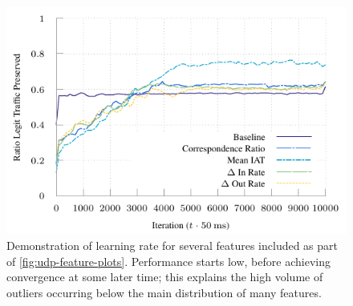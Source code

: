 \documentclass[conference, a4paper, 10pt, times]{IEEEtran}
\begin{document}
\begin{figure}
	\centering
	\includegraphics[width=0.9\linewidth]{../plots/ftprep-good-2}
	\caption{
		Demonstration of learning rate for several features included as part of \cref{fig:udp-feature-plots}.
		Performance starts low, before achieving convergence at some later time; this explains the high volume of outliers occurring below the main distribution of many features.
		\label{fig:udp-fp-converge}
	}
\end{figure}

\end{document}
